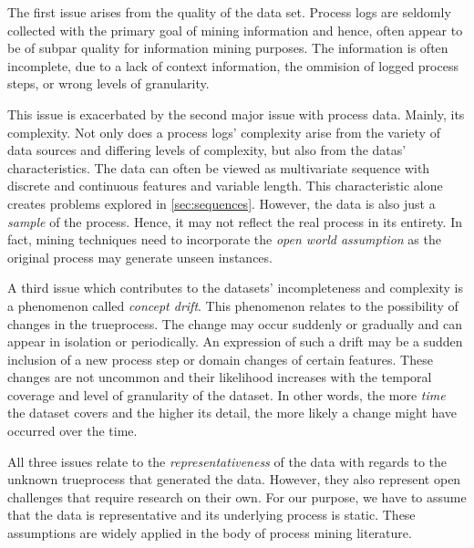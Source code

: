 \documentclass[./../../paper.tex]{subfiles}
\begin{document}
The first issue arises from the quality of the data set. Process logs are seldomly collected with the primary goal of mining information and hence, often appear to be of subpar quality for information mining purposes. The information is often incomplete, due to a lack of context information, the ommision of logged process steps, or wrong levels of granularity\autocite{vanderaalst_ProcessMiningManifesto_2012}.

This issue is exacerbated by the second major issue with process data. Mainly, its complexity. Not only does a process logs' complexity arise from the variety of data sources and differing levels of complexity, but also from the datas' characteristics. The data can often be viewed as multivariate sequence with discrete and continuous features and variable length. 
This characteristic alone creates problems explored in \autoref{sec:sequences}. However, the data is also just a \emph{sample} of the process.
Hence, it may not reflect the real process in its entirety. In fact, mining techniques need to incorporate the \emph{open world assumption} as the original process may generate unseen \glspl{instance}\autocite{vanderaalst_ProcessMiningManifesto_2012}.

A third issue which contributes to the datasets' incompleteness and complexity is a phenomenon called \emph{concept drift}\autocite{vanderaalst_ProcessMiningManifesto_2012}. This phenomenon relates to the possibility of changes in the \gls{trueprocess}. The change may occur suddenly or gradually and can appear in isolation or periodically. An expression of such a drift may be a sudden inclusion of a new process step or domain changes of certain features. These changes are not uncommon and their likelihood increases with the temporal coverage and level of granularity of the dataset\autocite{vanderaalst_ProcessMiningManifesto_2012}. In other words, the more \emph{time} the dataset covers and the higher its detail, the more likely a change might have occurred over the time.

All three issues relate to the \emph{representativeness} of the data with regards to the unknown \gls{trueprocess} that generated the data. However, they also represent open challenges that require research on their own. For our purpose, we have to assume that the data is representative and its underlying process is static. These assumptions are widely applied in the body of process mining literature\autocites{tax_PredictiveBusinessProcess_2017a,klimek_Longtermseriesforecasting_2021}.
\end{document}
